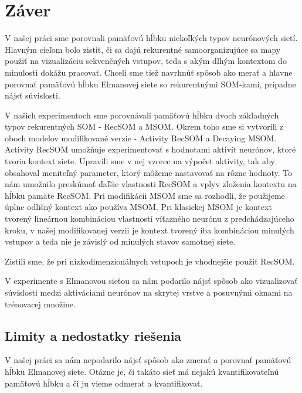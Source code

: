 \chapter*{Záver}
V našej práci sme porovnali pamäťovú hĺbku niekoľkých typov neurónových sietí.
Hlavným cieľom bolo zistiť, či sa dajú rekurentné samoorganizujúce sa mapy použiť na vizualizáciu
sekvenčných vstupov, teda s akým dlhým kontextom do minulosti dokážu pracovať. Chceli sme tiež navrhnúť 
spôsob ako merať a hlavne porovnať pamäťovú hĺbku Elmanovej siete so rekurentnými SOM-kami, prípadne 
nájsť súvislosti.

V našich experimentoch sme porovnávali pamäťovú hĺbku dvoch základných typov rekurentných 
SOM - RecSOM a MSOM. Okrem toho sme si vytvorili z oboch modelov modifikované verzie - Activity RecSOM a Decaying MSOM.
Activity RecSOM umožňuje experimentovať s hodnotami aktivít neurónov, ktoré tvoria kontext siete. Upravili sme v nej
vzorec na výpočet aktivity, tak aby obsahoval meniteľný parameter, ktorý môžeme nastavovať na rôzne hodnoty.
To nám umožnilo preskúmať ďaľšie vlastnosti RecSOM a vplyv zloženia kontextu na hĺbku pamäte RecSOM.
Pri modifikácii MSOM sme sa rozhodli, že použijeme úplne odlišný kontext ako používa MSOM. Pri klasickej MSOM
je kontext tvorený lineárnou kombináciou vlastností víťazného neurónu z predchádzajúceho kroku, v našej modifikovanej 
verzii je kontext tvorený iba kombináciou minulých vstupov a teda nie je závislý od minulých stavov samotnej siete.

Zistili sme, že pri nízkodimenzionálnych vstupoch je vhodnejšie použiť RecSOM.


V experimente s Elmanovou sieťou sa nám podarilo nájsť spôsob ako vizualizovať súvislosti medzi 
aktiváciami neurónov na skrytej vrstve a posuvnými oknami na trénovacej množine.

\section{Limity a nedostatky riešenia}
V našej práci sa nám nepodarilo nájsť spôsob ako zmerať a porovnať pamäťovú hĺbku Elmanovej siete.
Otázne je, či takáto sieť má nejakú kvantifikovateľnú pamäťovú hĺbku a či ju vieme odmerať a kvantifikovať.

